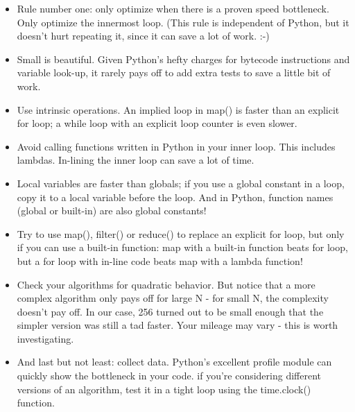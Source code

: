 \documentclass[a4paper,twoside]{article}
\begin{document}
\begin{itemize}
\item Rule number one: only optimize when there is a proven speed bottleneck. Only optimize the innermost loop. (This rule is independent of Python, but it doesn't hurt repeating it, since it can save a lot of work. :-)
\item Small is beautiful. Given Python's hefty charges for bytecode instructions and variable look-up, it rarely pays off to add extra tests to save a little bit of work.
\item Use intrinsic operations. An implied loop in map() is faster than an explicit for loop; a while loop with an explicit loop counter is even slower.
\item Avoid calling functions written in Python in your inner loop. This includes lambdas. In-lining the inner loop can save a lot of time.
\item Local variables are faster than globals; if you use a global constant in a loop, copy it to a local variable before the loop. And in Python, function names (global or built-in) are also global constants!
\item Try to use map(), filter() or reduce() to replace an explicit for loop, but only if you can use a built-in function: map with a built-in function beats for loop, but a for loop with in-line code beats map with a lambda function!
\item Check your algorithms for quadratic behavior. But notice that a more complex algorithm only pays off for large N - for small N, the complexity doesn't pay off. In our case, 256 turned out to be small enough that the simpler version was still a tad faster. Your mileage may vary - this is worth investigating.
\item And last but not least: collect data. Python's excellent profile module can quickly show the bottleneck in your code. if you're considering different versions of an algorithm, test it in a tight loop using the time.clock() function. 
\end{itemize}


\printindex
\end{document}
